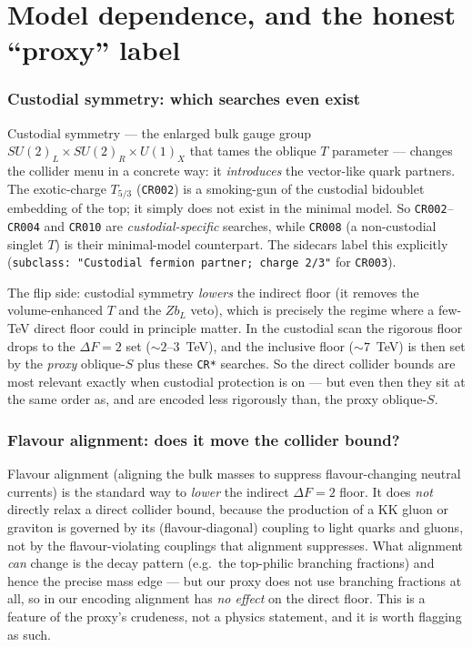 \documentclass[11pt]{article}
\newcommand{\SUL}{SU(2)_L}
\newcommand{\SUR}{SU(2)_R}
\newcommand{\UX}{U(1)_X}
\newcommand{\code}[1]{\texttt{#1}}
\theoremstyle{definition}
\begin{document}
\part{Model dependence, and the honest ``proxy'' label}
\label{part:model}

\section{Custodial symmetry: which searches even exist}
\label{sec:custodial}

Custodial symmetry --- the enlarged bulk gauge group $\SUL\times\SUR\times\UX$
that tames the oblique $T$ parameter --- changes the collider menu in a concrete
way: it \emph{introduces} the vector-like quark partners. The exotic-charge
$T_{5/3}$ (\code{CR002}) is a smoking-gun of the custodial bidoublet embedding of
the top; it simply does not exist in the minimal model. So \code{CR002}--\code{CR004}
and \code{CR010} are \emph{custodial-specific} searches, while \code{CR008} (a
non-custodial singlet $T$) is their minimal-model counterpart. The sidecars label
this explicitly (\code{subclass: "Custodial fermion partner; charge 2/3"} for
\code{CR003}).

The flip side: custodial symmetry \emph{lowers} the indirect floor (it removes
the volume-enhanced $T$ and the $Zb_L$ veto), which is precisely the regime where
a few-TeV direct floor could in principle matter. In the custodial scan the
rigorous floor drops to the $\Delta F = 2$ set ($\sim 2$--$3$~TeV), and the
inclusive floor ($\sim 7$~TeV) is then set by the \emph{proxy} oblique-$S$ plus
these \code{CR*} searches. So the direct collider bounds are most relevant
exactly when custodial protection is on --- but even then they sit at the same
order as, and are encoded less rigorously than, the proxy oblique-$S$.

\section{Flavour alignment: does it move the collider bound?}
\label{sec:alignment}

Flavour alignment (aligning the bulk masses to suppress flavour-changing neutral
currents) is the standard way to \emph{lower} the indirect $\Delta F = 2$ floor.
It does \emph{not} directly relax a direct collider bound, because the production
of a KK gluon or graviton is governed by its (flavour-diagonal) coupling to light
quarks and gluons, not by the flavour-violating couplings that alignment
suppresses. What alignment \emph{can} change is the decay pattern (e.g.\ the
top-philic branching fractions) and hence the precise mass edge --- but our proxy
does not use branching fractions at all, so in our encoding alignment has
\emph{no effect} on the direct floor. This is a feature of the proxy's
crudeness, not a physics statement, and it is worth flagging as such.
\end{document}
